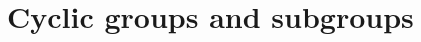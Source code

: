 \documentclass[11pt,a4paper]{article}
\begin{document}
\def\contador{Lesson 7}


\section{Cyclic groups and subgroups}
\end{document}
